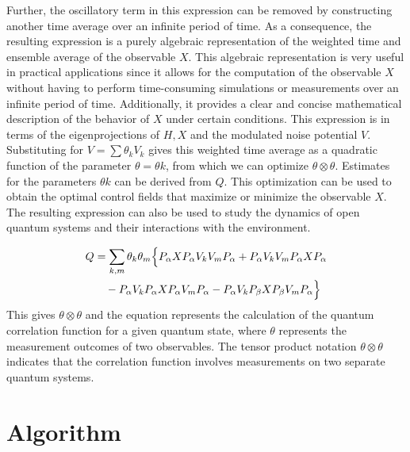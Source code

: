 \documentclass[journal,twocolumn]{IEEEtran}
\begin{document}
Further, the oscillatory term in this expression can be removed by constructing another time average over an infinite period of time. As a consequence, the resulting expression is a purely algebraic representation of the weighted time and ensemble average of the observable $X$. This algebraic representation is very useful in practical applications since it allows for the computation of the observable $X$ without having to perform time-consuming simulations or measurements over an infinite period of time. Additionally, it provides a clear and concise mathematical description of the behavior of $X$ under certain conditions. This expression is in terms of the eigenprojections of $H, X$ and the modulated noise potential $V$. Substituting for $V= \sum\theta_k V_k$ gives this weighted time average as a quadratic function of the parameter $\theta=\theta k$, from which we can optimize $\theta\otimes\theta$. Estimates for the parameters $\theta k$ can be derived from $Q$. This optimization can be used to obtain the optimal control fields that maximize or minimize the observable $X$. The resulting expression can also be used to study the dynamics of open quantum systems and their interactions with the environment.

\begin{align}\nonumber
Q &= \sum_{k,m} \theta_k\theta_m \Bigl\{
      P_\alpha X P_\alpha V_k V_m P_\alpha
    + P_\alpha V_k V_m P_\alpha X P_\alpha
\\ &\quad
    - P_\alpha V_k P_\alpha X P_\alpha V_m P_\alpha
    - P_\alpha V_k P_\beta X P_\beta V_m P_\alpha
   \Bigr\}
\end{align}
This gives $\theta \otimes \theta$ and the equation represents the calculation of the quantum correlation function for a given quantum state, where $\theta$ represents the measurement outcomes of two observables. The tensor product notation $\theta \otimes \theta$ indicates that the correlation function involves measurements on two separate quantum systems.

\section{Algorithm}
\end{document}
